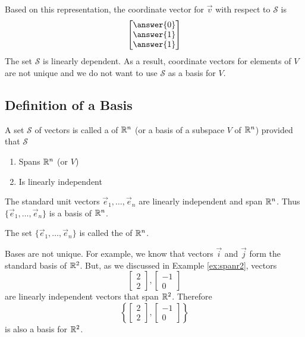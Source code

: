 \documentclass{ximera}
\begin{document}
\begin{example}
\begin{explanation}
Based on this representation, the coordinate vector for $\vec{v}$ with respect to $\mathcal{S}$ is
$$\begin{bmatrix}\answer{0}\\\answer{1}\\\answer{1}\end{bmatrix}$$
The set $\mathcal{S}$ is linearly dependent.  As a result, coordinate vectors for elements of $V$ are not unique and we do not want to use $\mathcal{S}$ as a basis for $V$.
\end{explanation}
\end{example}




\subsection*{Definition of a Basis}

\begin{definition}\label{def:basis}
A set $\mathcal{S}$ of vectors is called a  of $\mathbb{R}^n$ (or a basis of a subspace $V$ of $\mathbb{R}^n$) provided that $\mathcal{S}$
\begin{enumerate}
\item \label{item:defbasis1}
Spans $\mathbb{R}^n$ (or $V$)
\item \label{item:defbasis2}
Is linearly independent
\end{enumerate}
\end{definition}

\begin{example}\label{ex:standardbasis}
The standard unit vectors $\vec{e}_1, \ldots ,\vec{e}_n$ are linearly independent and span $\mathbb{R}^n$.  Thus $\{\vec{e}_1, \ldots ,\vec{e}_n\}$ is a basis of $\mathbb{R}^n$.
\end{example}

\begin{definition}\label{def:standardbasis} The set $\{\vec{e}_1, \ldots ,\vec{e}_n\}$ is called the  of $\mathbb{R}^n$.
\end{definition}

Bases are not unique.  For example, we know that vectors $\vec{i}$ and $\vec{j}$ form the standard basis of $\mathbb{R}^2$.  But, as we discussed in Example \ref{ex:spanr2}, vectors 
$$\begin{bmatrix}2\\2\end{bmatrix}, \begin{bmatrix}-1\\0\end{bmatrix}$$
are linearly independent vectors that span $\mathbb{R}^2$.  Therefore $$\left\{\begin{bmatrix}2\\2\end{bmatrix}, \begin{bmatrix}-1\\0\end{bmatrix}\right\}$$
is also a basis for $\mathbb{R}^2$.
\end{document}
